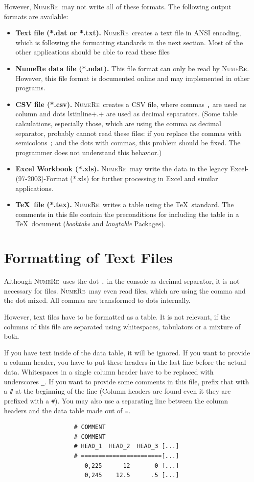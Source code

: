 \documentclass[DIV=14,headsepline,footsepline]{scrbook}
\newcommand{\NR}{\textsc{Nu\-me\-Re}}
\begin{document}
				However, \NR\ may not write all of these formats. The following output formats are available:
				\begin{itemize}
					\item \textbf{Text file (*.dat or *.txt).} \NR\ creates a text file in ANSI encoding, which is following the formatting standards in the next section. Most of the other applications should be able to read these files
					\item \textbf{NumeRe  data file (*.ndat).} This file format can only be read by \NR. However, this file format is documented online and may implemented in other programs.
					\item \textbf{CSV file (*.csv).} \NR\ creates a CSV file, where commas \lstinline+,+ are used as column and dots lstinline+.+ are used as decimal separators. (Some table calculations, especially those, which are using the comma as decimal separator, probably cannot read these files: if you replace the commas with semicolons \lstinline+;+ and the dots with commas, this problem should be fixed. The programmer does not understand this behavior.)
					\item \textbf{Excel Workbook (*.xls).} \NR\ may write the data in the legacy Excel-(97-2003)-Format (*.xls) for further processing in Excel and similar applications.
					\item \textbf{\TeX\ file (*.tex).} \NR\ writes a table using the \TeX\ standard. The comments in this file contain the preconditions for including the table in a \TeX\ document (\emph{booktabs} and \emph{longtable} Packages).
				\end{itemize}
				
			\section{Formatting of Text Files}
				Although \NR\ uses the dot \lstinline+.+ in the console as decimal separator, it is not necessary for files. \NR\ may even read files, which are using the comma and the dot mixed. All commas are transformed to dots internally.
				
				However, text files have to be formatted as a table. It is not relevant, if the columns of this file are separated using whitespaces, tabulators or a mixture of both.
				
				If you have text inside of the data table, it will be ignored. If you want to provide a column header, you have to put these headers in the last line before the actual data. Whitespaces in a single column header have to be replaced with underscores \lstinline+_+. If you want to provide some comments in this file, prefix that with a \lstinline+#+ at the beginning of the line (Column headers are found even it they are prefixed with a \lstinline+#+). You may also use a separating line between the column headers and the data table made out of \lstinline+=+.
				\begin{verbatim}
					# COMMENT
					# COMMENT
					# HEAD_1  HEAD_2  HEAD_3 [...]
					# =======================[...]
					   0,225      12       0 [...]
					   0,245    12.5      .5 [...]
				\end{verbatim}
				
\end{document}
